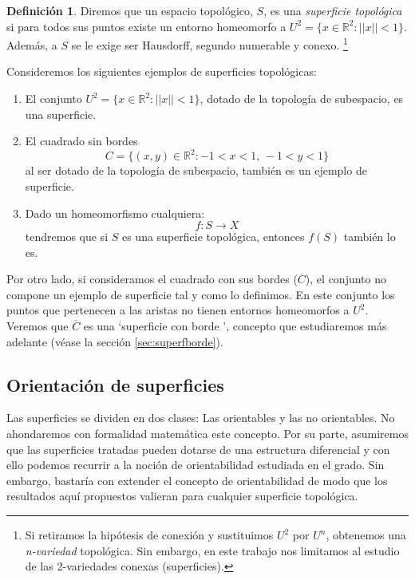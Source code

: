 \documentclass[a4paper,11pt,spanish, twoside, leqno]{tfg-uam}
\theoremstyle{definition}
\newtheorem{defin}[teor]{Definici\'on}
\begin{document}
\begin{defin}
\label{defin:superficie}
Diremos que un espacio topológico, $S$, es una \textit{superficie topológica} si para todos sus puntos existe un entorno homeomorfo a $U^2 = \{x\in \mathbb{R}^2: ||x||<1 \}$. Además, a $S$ se le exige ser Hausdorff, segundo numerable y conexo. \footnote{Si retiramos la hipótesis de conexión y sustituimos $U^2$ por $U^n$, obtenemos una \textit{n-variedad} topológica. Sin embargo, en este trabajo nos limitamos al estudio de las 2-variedades conexas (superficies).}
\end{defin}
Consideremos los siguientes ejemplos de superficies topológicas:
\begin{enumerate}
\item El conjunto $ U^2 = \{ x\in\mathbb{R}^2: ||x||<1 \} $, dotado de la topología de subespacio, es una superficie. 

\item El cuadrado sin bordes
\[ C = \{(x,y)\in \mathbb{R}^2: -1 <  x < 1,\, -1 < y < 1 \} \]
al ser dotado de la topología de subespacio, también es un ejemplo de superficie.

\item Dado un homeomorfismo cualquiera:
\[ f:S \rightarrow X \]
tendremos que si $S$ es una superficie topológica, entonces $f(S)$ también lo es.
\end{enumerate}

Por otro lado, si consideramos el cuadrado con sus bordes ($\overline{C}$), el conjunto no compone un ejemplo de superficie tal y como lo definimos. En este conjunto los puntos que pertenecen a las aristas no tienen entornos homeomorfos a $U^2$. Veremos que $\overline{C}$ es una \textquoteleft superficie con borde \textquoteright, concepto que estudiaremos más adelante (véase la sección \ref{sec:superfborde}).
\subsection{Orientación de superficies}
\label{sec:orientabilidad}
Las superficies se dividen en dos clases: Las orientables y las no orientables. No ahondaremos con formalidad matemática este concepto. Por su parte, asumiremos que las superficies tratadas pueden dotarse de una estructura diferencial y con ello podemos recurrir a la noción de orientabilidad estudiada en el grado. Sin embargo, bastaría con extender el concepto de orientabilidad de modo que los resultados aquí propuestos valieran para cualquier superficie topológica.
\end{document}
